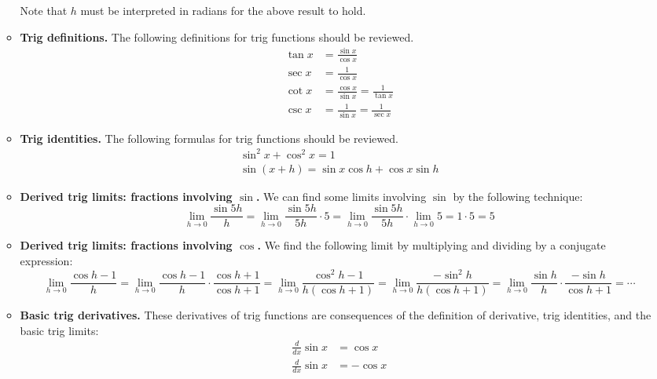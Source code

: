 \documentclass{article}
\begin{document}
\begin{itemize}
\begin{itemize}
    Note that $h$ must be interpreted in radians for the above result to
    hold.
  \item \textbf{Trig definitions.}  The following definitions for trig
    functions should be reviewed.
    \begin{align*}
      \tan x &= \frac{\sin x}{\cos x} \\
      \sec x &= \frac{1}{\cos x} \\
      \cot x &= \frac{\cos x}{\sin x} = \frac{1}{\tan x} \\
      \csc x &= \frac{1}{\sin x} = \frac{1}{\sec x}
    \end{align*}
  \item \textbf{Trig identities.}  The following formulas for trig functions
    should be reviewed.
    \begin{align*}
      \sin^2 x + \cos^2 x = 1 \\
      \sin(x+h) = \sin x \cos h + \cos x \sin h
    \end{align*}
  \item \textbf{Derived trig limits: fractions involving $\sin$.}  We can
    find some limits involving $\sin$ by the following technique:
    \begin{displaymath}
      \lim_{h\to 0} \frac{\sin 5h}{h}
      = \lim_{h\to 0} \frac{\sin 5h}{5h} \cdot 5
      = \lim_{h\to 0} \frac{\sin 5h}{5h} \cdot \lim_{h\to 0} 5
      = 1 \cdot 5 = 5
    \end{displaymath}
  \item \textbf{Derived trig limits: fractions involving $\cos$.}  We find
    the following limit by multiplying and dividing by a conjugate expression:
    \begin{displaymath}
      \lim_{h\to 0} \frac{\cos h - 1}{h}
      = \lim_{h\to 0} \frac{\cos h - 1}{h} \cdot \frac{\cos h + 1}{\cos h + 1}
      = \lim_{h\to 0} \frac{\cos^2 h - 1}{h(\cos h+1)}
      = \lim_{h\to 0} \frac{-\sin^2 h}{h(\cos h+1)}
      = \lim_{h\to 0} \frac{\sin h}{h} \cdot \frac{-\sin h}{\cos h+1}
      = \cdots
    \end{displaymath}
  \item \textbf{Basic trig derivatives.}  These derivatives of trig functions
    are consequences of the definition of derivative, trig identities, and
    the basic trig limits:
    \begin{align*}
      \frac{d}{dx} \sin x &= \cos x \\
      \frac{d}{dx} \sin x &= -\cos x
    \end{align*}

\end{itemize}
\end{itemize}
\end{document}
